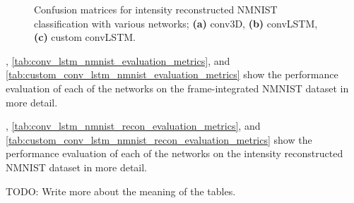 \begin{figure}[htb]%
    \centering
    \qquad
    \qquad
    \caption{Confusion matrices for intensity reconstructed NMNIST classification with various networks; \textbf{(a)} conv3D, \textbf{(b)} convLSTM, \textbf{(c)} custom convLSTM.}%
    \label{fig:nmnist_recon_c_matrices}%
\end{figure}

, \cref{tab:conv_lstm_nmnist_evaluation_metrics}, and \cref{tab:custom_conv_lstm_nmnist_evaluation_metrics} show the performance evaluation of each of the networks on the frame-integrated NMNIST dataset in more detail.

, \cref{tab:conv_lstm_nmnist_recon_evaluation_metrics}, and \cref{tab:custom_conv_lstm_nmnist_recon_evaluation_metrics} show the performance evaluation of each of the networks on the intensity reconstructed NMNIST dataset in more detail.

\color{red} TODO: Write more about the meaning of the tables. \color{black}


